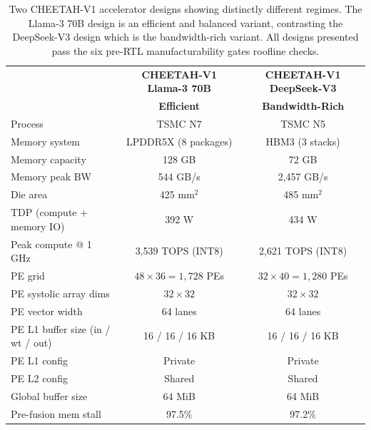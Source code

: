 \begin{table}[t]
\centering
\caption{
Two CHEETAH-V1 accelerator designs showing distinctly different regimes.
The Llama-3 70B design is an efficient and balanced variant,
contrasting the DeepSeek-V3 design which is the bandwidth-rich variant.
All designs presented pass the six pre-RTL
manufacturability gates roofline checks.
}
\label{tab:cheetah_two_blueprints}
\small
\setlength{\tabcolsep}{4pt}
\begin{tabular}{@{}lcc@{}}
\toprule
 & \textbf{CHEETAH-V1 Llama-3 70B} & \textbf{CHEETAH-V1 DeepSeek-V3} \\
 & \textbf{Efficient} & \textbf{Bandwidth-Rich} \\
\midrule
Process                        & TSMC N7                          & TSMC N5 \\
Memory system                       & LPDDR5X (8 packages)             & HBM3 (3 stacks) \\
Memory capacity                     & 128 GB                           & 72 GB \\
Memory peak BW                      & 544 GB/s                         & 2{,}457 GB/s \\
Die area                            & 425 mm$^2$                       & 485 mm$^2$ \\
TDP (compute + memory IO)           & 392 W                            & 434 W \\
Peak compute @ 1 GHz                & 3,539 TOPS (INT8)              & 2,621 TOPS (INT8) \\
PE grid                             & $48 \times 36 = 1,728$ PEs & $32 \times 40 = 1,280$ PEs \\
PE systolic array dims              & $32 \times 32$                   & $32 \times 32$ \\
PE vector width                     & 64 lanes                         & 64 lanes \\
PE L1 buffer size (in / wt / out)   & 16 / 16 / 16 KB                  & 16 / 16 / 16 KB \\
PE L1 config                        & Private                          & Private \\
PE L2 config                        & Shared                           & Shared \\
Global buffer size                  & 64 MiB                           & 64 MiB \\
\midrule
Pre-fusion mem stall               & 97.5\%                           & 97.2\% \\

\end{tabular}
\end{table}
